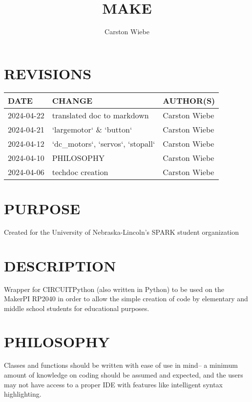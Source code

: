 \documentclass[leqno]{article}
\title{MAKE}
\author{Carston Wiebe}
\begin{document}
\maketitle

\section{REVISIONS}

\begin{table*}[htp]
  \centering
  \def\arraystretch{1.5}
  \begin{tabular}{|l|l|l|}
    \hline
    DATE & CHANGE & AUTHOR(S) \\
    \hline\hline
    2024-04-22 & translated doc to markdown & Carston Wiebe \\\hline
    2024-04-21 & `largemotor` \& `button` & Carston Wiebe \\\hline
    2024-04-12 & `dc\_motors`, `servos`, `stopall` & Carston Wiebe \\\hline
    2024-04-10 & PHILOSOPHY & Carston Wiebe \\\hline
    2024-04-06 & techdoc creation & Carston Wiebe \\\hline
  \end{tabular}
\end{table*}

\section{PURPOSE}

Created for the University of Nebraska-Lincoln's SPARK student organization

\section{DESCRIPTION}

Wrapper for CIRCUITPython (also written in Python) to be used on the MakerPI
RP2040 in order to allow the simple creation of code by elementary and middle
school students for educational purposes.

\section{PHILOSOPHY}

Classes and functions should be written with ease of use in mind-- a minimum
amount of knowledge on coding should be assumed and expected, and the users may
not have access to a proper IDE with features like intelligent syntax
highlighting.
\end{document}
